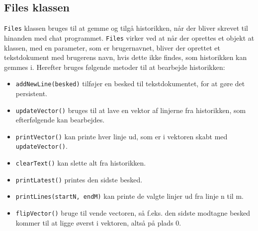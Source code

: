 \subsection{Files klassen}
\texttt{Files} klassen bruges til at gemme og tilgå historikken, når der bliver skrevet til hinanden med chat programmet. \texttt{Files} virker ved at når der oprettes et objekt at klassen, med en parameter, som er brugernavnet, bliver der oprettet et tekstdokument med brugerens navn, hvis dette ikke findes, som historikken kan gemmes i. Herefter bruges følgende metoder til at bearbejde historikken:
\begin{itemize}
	\item \texttt{addNewLine(besked)} tilføjer en besked til tekstdokumentet, for at gøre det persistent.
	
	\item \texttt{updateVector()} bruges til at lave en vektor af linjerne fra historikken, som efterfølgende kan bearbejdes.
	
	\item \texttt{printVector()} kan printe hver linje ud, som er i vektoren skabt med \texttt{updateVector()}.
	
	\item \texttt{clearText()} kan slette alt fra historikken.
	
	\item \texttt{printLatest()} printes den sidste besked.
	
	\item \texttt{printLines(startN, endM)} kan printe de valgte linjer ud fra linje n til m.
	
	\item \texttt{flipVector()} bruge til vende vectoren, så f.eks. den sidste modtagne besked kommer til at ligge øverst i vektoren, altså på plads 0.
\end{itemize}

